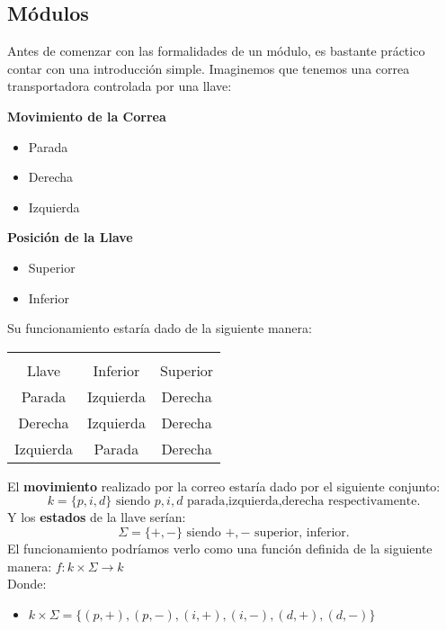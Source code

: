 \subsection{Módulos}
Antes de comenzar con las formalidades de un módulo, es bastante práctico contar con una introducción simple. Imaginemos que tenemos una correa transportadora controlada por una llave:
\begin{center}
\begin{multicols}{2}
\textbf{Movimiento de la Correa}
\begin{itemize}
\item Parada
\item Derecha
\item Izquierda
\end{itemize}
\columnbreak
\textbf{Posición de la Llave}
\begin{itemize}
\item Superior
\item Inferior
\end{itemize}
\end{multicols}
\end{center}
Su funcionamiento estaría dado de la siguiente manera:
\begin{center}
\begin{tabular}{|c|cc|}
    \hline
    \backslashbox{Correa}{\vspace{0.1pt}\\Llave} & Inferior & Superior \\ \hline
                Parada             &  Izquierda   &  Derecha \\ 
                Derecha            &  Izquierda   &  Derecha \\ 
                Izquierda          &  Parada      &  Derecha \\ \hline
\end{tabular} 
\end{center}
El \textbf{movimiento} realizado por la correo estaría dado por el siguiente conjunto:
$$ k = \{ p,i,d \} \text{ siendo $p,i,d$ parada,izquierda,derecha respectivamente.}$$
Y los \textbf{estados} de la llave serían:
$$ \Sigma = \{ +,- \} \text{ siendo $+,-$  superior, inferior.}$$
El funcionamiento podríamos verlo como una función definida de la siguiente manera: $f:k\times\Sigma \rightarrow k$ \\
Donde:
\begin{itemize}
\item $k\times\Sigma = \{ (p,+),(p,-),(i,+),(i,-),(d,+),(d,-) \}$
\end{itemize}
